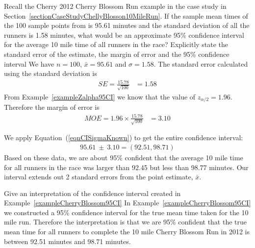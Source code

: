 \begin{example}{Recall the Cherry 2012 Cherry Blossom Run example in the case study in 
Section~\ref{sectionCaseStudyChellyBlosson10MileRun}. \label{exampleCherryBlossom95CI}
If the sample mean times of the 100 sample points from  is 95.61 minutes and the standard  deviation of all the runners is 1.58 minutes, what would be an approximate 95\% confidence interval for the average 10 mile time of all runners in the race?
Explicitly state the standard error of the estimate, the margin of error and the 95\% confidence interval}
We have $n=100$, $\bar{x} = 95.61$ and $\sigma = 1.58$.
The standard error calculated using the standard deviation is 
\begin{align*}
SE	=	\frac{15.78}{\sqrt{100}} & = 1.58
\end{align*}
From Example~\ref{exampleZalpha95CI} we know that the value of $z_{\alpha/2} = 1.96$.
Therefore the margin of error is
\begin{align*}
MOE	=	1.96 \times \frac{15.78}{\sqrt{100}} & = 3.10
\end{align*}

We apply Equation~(\ref{eqnCISigmaKnown}) to get the entire confidence interval:
\begin{eqnarray*}
95.61\ \pm\ 3.10 =  (92.51, 98.71)
\end{eqnarray*}
Based on these data, we are about 95\% confident that the average 10 mile time for all runners in the race was larger than 92.45 but less than 98.77 minutes. Our interval extends out 2 standard errors from the point estimate, $\bar{x}$.
\end{example}


\begin{example}{Give an interpretation of the confidence interval created in Example~\ref{exampleCherryBlossom95CI}}
In Example~\ref{exampleCherryBlossom95CI} we constructed a 95\% confidence interval
for the true mean time taken for the 10 mile run.
Therefore the interpretation is that we are 95\% confident that the true mean time for all runners 
to complete the 10 mile Cherry Blossom Run in 2012 is between 92.51 minutes and 98.71 minutes.
\end{example}

